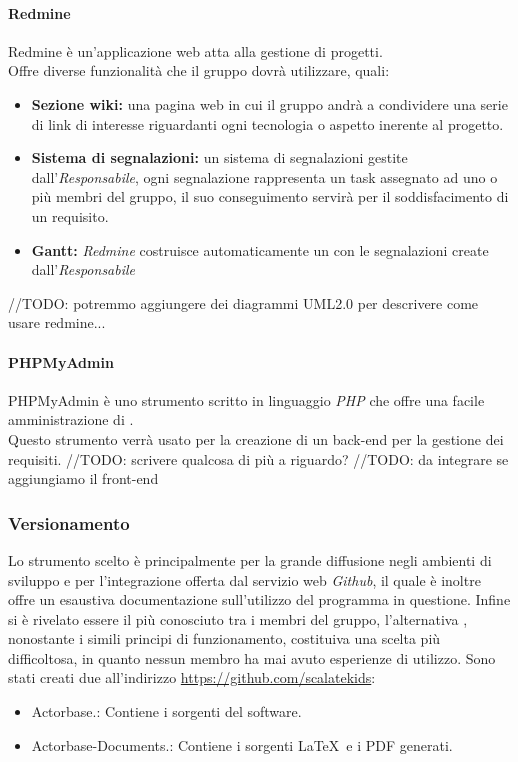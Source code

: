 \documentclass{scalatekids-article}
\begin{document}
\paragraph{Redmine}
Redmine è un'applicazione web atta alla gestione di progetti.\\
Offre diverse funzionalità che il gruppo dovrà utilizzare, quali:
\begin{itemize}
\item\textbf{Sezione wiki:} una pagina web in cui il gruppo andrà a condividere una serie di link di interesse riguardanti ogni tecnologia o aspetto inerente al progetto.
\item\textbf{Sistema di segnalazioni:} un sistema di segnalazioni gestite dall'\textit{Responsabile}, ogni segnalazione rappresenta un task assegnato ad uno o più membri del gruppo, il suo conseguimento servirà per il soddisfacimento di un requisito.
\item\textbf{Gantt:} \textit{Redmine} costruisce automaticamente un  con le segnalazioni create dall'\textit{Responsabile}
\end{itemize}
//TODO: potremmo aggiungere dei diagrammi UML2.0 per descrivere come usare redmine...

\paragraph{PHPMyAdmin}
PHPMyAdmin è uno strumento scritto in linguaggio \textit{PHP} che offre una facile amministrazione di .\\
Questo strumento verrà usato per la creazione di un back-end per la gestione dei requisiti.	//TODO: scrivere qualcosa di più a riguardo?
//TODO: da integrare se aggiungiamo il front-end

\subsubsection{Versionamento}
Lo strumento scelto è  principalmente per la grande diffusione negli
ambienti di sviluppo e per l'integrazione offerta dal servizio web
\textit{Github}, il quale è inoltre offre un esaustiva documentazione
sull'utilizzo del programma in questione. Infine  si è rivelato essere
il più conosciuto tra i membri del gruppo, l'alternativa , nonostante
i simili principi di funzionamento, costituiva una scelta più difficoltosa, in
quanto nessun membro ha mai avuto esperienze di utilizzo.
Sono stati creati due  all'indirizzo \url{https://github.com/scalatekids}:
\begin{itemize}
\item Actorbase.: Contiene i sorgenti del software.
\item Actorbase-Documents.: Contiene i sorgenti \LaTeX\ e i PDF generati.
\end{itemize}
\end{document}
